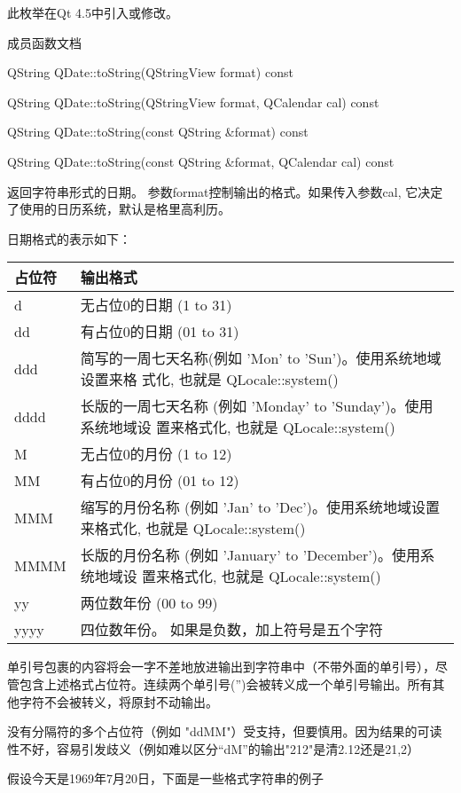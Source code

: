 此枚举在Qt 4.5中引入或修改。

\splitLine

成员函数文档

QString QDate::toString(QStringView format) const

QString QDate::toString(QStringView format, QCalendar cal) const

QString QDate::toString(const QString \&format) const

QString QDate::toString(const QString \&format, QCalendar cal) const

返回字符串形式的日期。 参数format控制输出的格式。如果传入参数cal, 它决定了使用的日历系统，默认是格里高利历。

日期格式的表示如下：

\begin{tabular}{|l|l|}
\hline
占位符 &	输出格式\\
\hline
d&	无占位0的日期 (1 to 31)\\
\hline
dd&	有占位0的日期 (01 to 31)\\
\hline
ddd&	简写的一周七天名称(例如 'Mon' to 'Sun')。使用系统地域设置来格
     式化, 也就是 QLocale::system()\\
\hline
dddd&	长版的一周七天名称 (例如 'Monday' to 'Sunday')。使用系统地域设
      置来格式化, 也就是 QLocale::system()\\
\hline
M&	无占位0的月份 (1 to 12)\\
\hline
MM&	有占位0的月份 (01 to 12)\\
\hline
MMM&	缩写的月份名称 (例如 'Jan' to 'Dec')。使用系统地域设置来格式化,
     也就是 QLocale::system()\\
\hline
MMMM&	长版的月份名称 (例如 'January' to 'December')。使用系统地域设
      置来格式化, 也就是 QLocale::system()\\
\hline
yy&	两位数年份 (00 to 99)\\
\hline
yyyy&	四位数年份。 如果是负数，加上符号是五个字符\\
\hline
\end{tabular}

单引号包裹的内容将会一字不差地放进输出到字符串中（不带外面的单引号），尽管包含上述格式占位符。连续两个单引号('')会被转义成一个单引号输出。所有其他字符不会被转义，将原封不动输出。

没有分隔符的多个占位符（例如 "ddMM"）受支持，但要慎用。因为结果的可读性不好，容易引发歧义（例如难以区分“dM”的输出"212"是清2.12还是21,2）

假设今天是1969年7月20日，下面是一些格式字符串的例子


